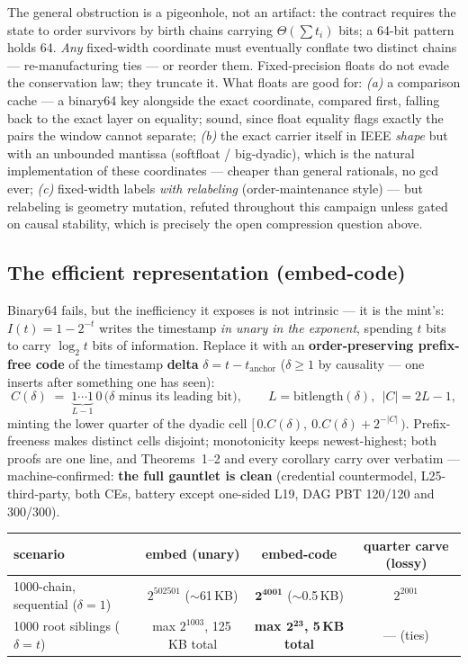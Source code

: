 \documentclass[11pt]{article}
\begin{document}
\noindent The general obstruction is a pigeonhole, not an artifact: the
contract requires the state to order survivors by birth chains carrying
$\Theta(\sum t_i)$ bits; a 64-bit pattern holds 64. \emph{Any}
fixed-width coordinate must eventually conflate two distinct chains ---
re-manufacturing ties --- or reorder them. Fixed-precision floats do
not evade the conservation law; they truncate it. What floats are good
for: \emph{(a)} a comparison cache --- a binary64 key alongside the
exact coordinate, compared first, falling back to the exact layer on
equality; sound, since float equality flags exactly the pairs the
window cannot separate; \emph{(b)} the exact carrier itself in
IEEE \emph{shape} but with an unbounded mantissa (softfloat /
big-dyadic), which is the natural implementation of these coordinates
--- cheaper than general rationals, no gcd ever; \emph{(c)} fixed-width
labels \emph{with relabeling} (order-maintenance style) --- but
relabeling is geometry mutation, refuted throughout this campaign
unless gated on causal stability, which is precisely the open
compression question above.


\subsection*{The efficient representation (embed-code)}

Binary64 fails, but the inefficiency it exposes is not intrinsic --- it
is the mint's: $I(t) = 1 - 2^{-t}$ writes the timestamp \emph{in unary
in the exponent}, spending $t$ bits to carry $\log_2 t$ bits of
information. Replace it with an \textbf{order-preserving prefix-free
code} of the timestamp \textbf{delta} $\delta = t - t_{\mathrm{anchor}}$
($\delta \ge 1$ by causality --- one inserts after something one has
seen):
\[
  C(\delta) \;=\; \underbrace{1\cdots1}_{L-1}\,0\,\bigl(\delta
  \text{ minus its leading bit}\bigr),
  \qquad L = \mathrm{bitlength}(\delta),\ \ |C| = 2L-1 ,
\]
minting the lower quarter of the dyadic cell $[\,0.C(\delta),\
0.C(\delta) + 2^{-|C|}\,)$. Prefix-freeness makes distinct cells
disjoint; monotonicity keeps newest-highest; both proofs are one line,
and Theorems~1--2 and every corollary carry over verbatim ---
machine-confirmed: \textbf{the full gauntlet is clean} (credential
countermodel, L25-third-party, both CEs, battery except one-sided L19,
DAG PBT 120/120 and 300/300).

\begin{center}\footnotesize\setlength{\tabcolsep}{4pt}
\begin{tabular}{@{}lccc@{}}
\toprule
scenario & embed (unary) & \textbf{embed-code} & quarter carve (lossy) \\
\midrule
1000-chain, sequential ($\delta = 1$) & $2^{502501}$ ($\sim$61\,KB) &
  $\boldsymbol{2^{4001}}$ ($\sim$0.5\,KB) & $2^{2001}$ \\
1000 root siblings ($\delta = t$) & max $2^{1003}$, 125\,KB total &
  \textbf{max $\boldsymbol{2^{23}}$, 5\,KB total} & --- (ties) \\
\bottomrule
\end{tabular}
\end{center}
\end{document}
